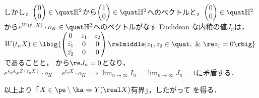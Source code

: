 \begin{pfwn}{}
  しかし，$
  \begin{pmatrix}
    0 \\ 0 
  \end{pmatrix}
  \in \quat\mathbb{H}^2 $から$
  \begin{pmatrix}
    1 \\ 0
  \end{pmatrix}
  \in \quat\mathbb{H}^2 $へのベクトルと，$
  \begin{pmatrix}
    0 \\ 0 
  \end{pmatrix}
  \in \quat\mathbb{H}^2 $から$e^{W(t_n X)}\cdot o_K \in \quat \mathbb{H}^2 $へのベクトルがなす Euclidean な内積の値$J_n$は，\\
  $W(t_n X)\in \lbig\{
  \begin{pmatrix}
    0 & z_1 & z_2 \\
    \bar{z_1} & 0 & 0\\
    \bar{z_2} & 0 & 0
  \end{pmatrix}
  \relmiddle| z_1, z_2\in \quat,\ \& \ \re z_1 = 0 \rbig\} $であることと， から$\re J_n = 0$となり，$e^{s_n A}e^{Z(t_n X)}\cdot o_K = e^{t_n X}\cdot o_K\implies \lim_{n\to \infty} I_n = \lim_{n\to \infty}J_n = 1 $に矛盾する．
  

  以上より「$X\in \pe\setminus\ha \Rightarrow Y(\real X) $有界」，したがって  を得る．
  
\end{pfwn}


